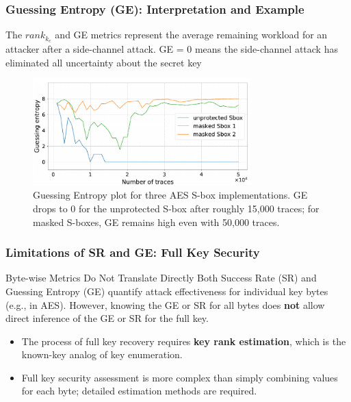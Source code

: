 \begin{frame}
    \frametitle{Guessing Entropy (GE): Interpretation and Example}

        The $rank_{k_c}$ and GE metrics represent the average remaining workload for an attacker after a side-channel attack.
        GE = 0 means the side-channel attack has eliminated all uncertainty about the secret key

    \begin{figure}
        \centering
        \includegraphics[width=0.75\textwidth]{metrics/Pictures/GE_plot.png}
        \caption{Guessing Entropy plot for three AES S-box implementations. GE drops to 0 for the unprotected S-box after roughly 15,000 traces; for masked S-boxes, GE remains high even with 50,000 traces.}
    \end{figure}
\end{frame}

\begin{frame}
    \frametitle{Limitations of SR and GE: Full Key Security}

    \begin{block}{Byte-wise Metrics Do Not Translate Directly}
        Both Success Rate (SR) and Guessing Entropy (GE) quantify attack effectiveness for individual key bytes (e.g., in AES). However, knowing the GE or SR for all bytes does \textbf{not} allow direct inference of the GE or SR for the full key.
    \end{block}

    \begin{itemize}
        \item The process of full key recovery requires \textbf{key rank estimation}, which is the known-key analog of key enumeration.
        \item Full key security assessment is more complex than simply combining values for each byte; detailed estimation methods are required.
    \end{itemize}
\end{frame}

